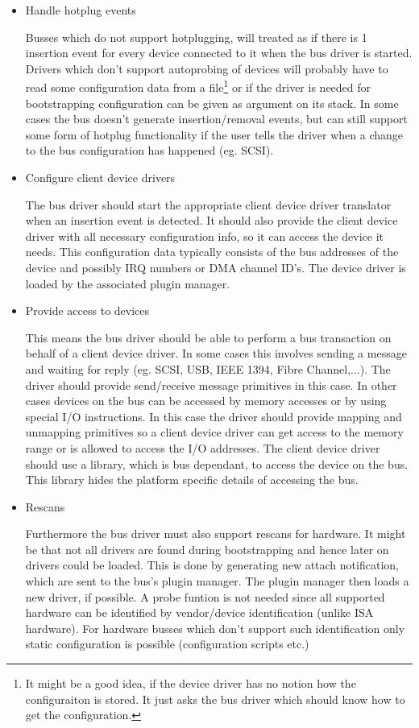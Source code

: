 \begin{itemize}
\item Handle hotplug events

  Busses which do not support hotplugging, will treated as if there is
  1 insertion event for every device connected to it when the bus
  driver is started.  Drivers which don't support autoprobing of
  devices will probably have to read some configuration data from a
  file\footnote{It might be a good idea, if the device driver has no
  notion how the configuraiton is stored.  It just asks the bus driver
  which should know how to get the configuration.} or if the driver is
  needed for bootstrapping configuration can be given as argument on
  its stack.  In some cases the bus doesn't generate insertion/removal
  events, but can still support some form of hotplug functionality if
  the user tells the driver when a change to the bus configuration has
  happened (eg. SCSI).
\item Configure client device drivers

  The bus driver should start the appropriate client device driver
  translator when an insertion event is detected.  It should also
  provide the client device driver with all necessary configuration
  info, so it can access the device it needs.  This configuration data
  typically consists of the bus addresses of the device and possibly
  IRQ numbers or DMA channel ID's.  The device driver is loaded by the
  associated plugin manager.
\item Provide access to devices

  This means the bus driver should be able to perform a bus
  transaction on behalf of a client device driver.  In some cases this
  involves sending a message and waiting for reply (eg. SCSI, USB,
  IEEE 1394, Fibre Channel,...).  The driver should provide
  send/receive message primitives in this case.  In other cases
  devices on the bus can be accessed by memory accesses or by using
  special I/O instructions.  In this case the driver should provide
  mapping and unmapping primitives so a client device driver can get
  access to the memory range or is allowed to access the I/O
  addresses.  The client device driver should use a library, which is
  bus dependant, to access the device on the bus.  This library hides
  the platform specific details of accessing the bus.
\item Rescans

  Furthermore the bus driver must also support rescans for hardware.
  It might be that not all drivers are found during bootstrapping and
  hence later on drivers could be loaded.  This is done by generating
  new attach notification, which are sent to the bus's plugin manager.
  The plugin manager then loads a new driver, if possible.  A probe
  funtion is not needed since all supported hardware can be identified
  by vendor/device identification (unlike ISA hardware).  For hardware
  busses which don't support such identification only static
  configuration is possible (configuration scripts etc.)
\end{itemize}

